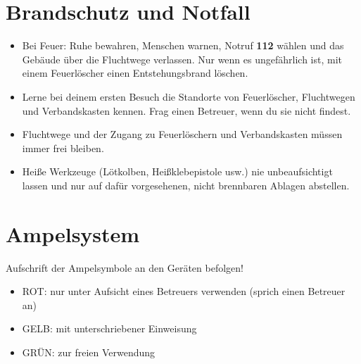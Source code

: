 \documentclass[13pt]{\basedir/fablab-document}
\begin{document}
\section{Brandschutz und Notfall}
\begin{itemize}
  \item Bei Feuer: Ruhe bewahren, Menschen warnen, Notruf \textbf{112} wählen und das Gebäude über die Fluchtwege verlassen. Nur wenn es ungefährlich ist, mit einem Feuerlöscher einen Entstehungsbrand löschen.
  \item Lerne bei deinem ersten Besuch die Standorte von Feuerlöscher, Fluchtwegen und Verbandskasten kennen. Frag einen Betreuer, wenn du sie nicht findest.
  \item Fluchtwege und der Zugang zu Feuerlöschern und Verbandskasten müssen immer frei bleiben.
  \item Heiße Werkzeuge (Lötkolben, Heißklebepistole usw.) nie unbeaufsichtigt lassen und nur auf dafür vorgesehenen, nicht brennbaren Ablagen abstellen.
\end{itemize}

\vbox{\vspace{0,5cm}}

\section{Ampelsystem}
Aufschrift der Ampelsymbole an den Geräten befolgen!
\begin{itemize}
 \item ROT: nur unter Aufsicht eines Betreuers verwenden (sprich einen Betreuer an)
 \item GELB: mit unterschriebener Einweisung
 \item GRÜN: zur freien Verwendung
\end{itemize}

\vbox{\vspace{0,5cm}}
\end{document}
